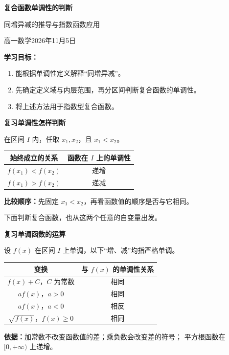 \documentclass[UTF8,10pt,aspectratio=169]{ctexbeamer}
\newcommand{\LessonTitle}{复合函数单调性的判断}
\newcommand{\LessonSubtitle}{同增异减的推导与指数函数应用}
\newcommand{\LessonInfo}{高一数学\qquad 2026年11月5日}
\newcommand{\PageHeading}[1]{\begin{center}{\Large\bfseries #1}\end{center}\vspace{0.2cm}}
\begin{document}
\begin{frame}[label=F01]
  \begin{center}
    {\Large\bfseries \LessonTitle}\par\vspace{0.4cm}
    {\large \LessonSubtitle}\par\vspace{0.4cm}
    \LessonInfo
  \end{center}
  \vspace{0.4cm}
  \textbf{学习目标：}
  \begin{enumerate}
    \item 能根据单调性定义解释“同增异减”。
    \item 先确定定义域与内层范围，再分区间判断复合函数的单调性。
    \item 将上述方法用于指数型复合函数。
  \end{enumerate}
\end{frame}

\begin{frame}[t,label=F01b]
  \PageHeading{复习\quad 单调性怎样判断}
  在区间 $I$ 内，任取 $x_1,x_2$，且 $x_1<x_2$。
  \begin{center}
  \renewcommand{\arraystretch}{1.8}
  \begin{tabular}{c|c}
    始终成立的关系 & 函数在 $I$ 上的单调性\\\hline
    $f(x_1)<f(x_2)$ & 递增\\
    $f(x_1)>f(x_2)$ & 递减
  \end{tabular}
  \end{center}
  \pause
  \textbf{比较顺序：}先固定 $x_1<x_2$，再看函数值的顺序是否与它相同。
  \par 下面判断复合函数，也从这两个任意的自变量出发。
\end{frame}

\begin{frame}[t,label=F02]
  \PageHeading{复习\quad 单调函数的运算}
  设 $f(x)$ 在区间 $I$ 上单调，以下“增、减”均指严格单调。
  \begin{center}
  \renewcommand{\arraystretch}{1.6}
  \begin{tabular}{c|c}
    变换 & 与 $f(x)$ 的单调性关系\\\hline
    $f(x)+C$，$C$ 为常数 & 相同\\
    $af(x)$，$a>0$ & 相同\\
    $af(x)$，$a<0$ & 相反\\
    $\sqrt{f(x)}$，$f(x)\ge0$ & 相同
  \end{tabular}
  \end{center}
  \pause
  \textbf{依据：}加常数不改变函数值的差；乘负数会改变差的符号；
  平方根函数在 $[0,+\infty)$ 上递增。
\end{frame}
\end{document}
